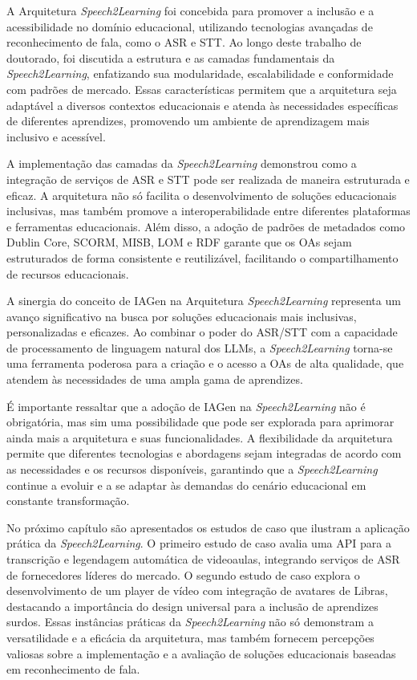 A Arquitetura \textit{Speech2Learning} foi concebida para promover a inclusão e a acessibilidade no domínio educacional, utilizando tecnologias avançadas de reconhecimento de fala, como o ASR e STT. Ao longo deste trabalho de doutorado, foi discutida a estrutura e as camadas fundamentais da \textit{Speech2Learning}, enfatizando sua modularidade, escalabilidade e conformidade com padrões de mercado. Essas características permitem que a arquitetura seja adaptável a diversos contextos educacionais e atenda às necessidades específicas de diferentes aprendizes, promovendo um ambiente de aprendizagem mais inclusivo e acessível.

A implementação das camadas da \textit{Speech2Learning} demonstrou como a integração de serviços de ASR e STT pode ser realizada de maneira estruturada e eficaz. A arquitetura não só facilita o desenvolvimento de soluções educacionais inclusivas, mas também promove a interoperabilidade entre diferentes plataformas e ferramentas educacionais. Além disso, a adoção de padrões de metadados como Dublin Core, SCORM, MISB, LOM e RDF garante que os OAs sejam estruturados de forma consistente e reutilizável, facilitando o compartilhamento de recursos educacionais.

A sinergia do conceito de IAGen na Arquitetura \textit{Speech2Learning} representa um avanço significativo na busca por soluções educacionais mais inclusivas, personalizadas e eficazes. Ao combinar o poder do ASR/STT com a capacidade de processamento de linguagem natural dos LLMs, a \textit{Speech2Learning} torna-se uma ferramenta poderosa para a criação e o acesso a OAs de alta qualidade, que atendem às necessidades de uma ampla gama de aprendizes.

É importante ressaltar que a adoção de IAGen na \textit{Speech2Learning} não é obrigatória, mas sim uma possibilidade que pode ser explorada para aprimorar ainda mais a arquitetura e suas funcionalidades. A flexibilidade da arquitetura permite que diferentes tecnologias e abordagens sejam integradas de acordo com as necessidades e os recursos disponíveis, garantindo que a \textit{Speech2Learning} continue a evoluir e a se adaptar às demandas do cenário educacional em constante transformação.

No próximo capítulo são apresentados os estudos de caso que ilustram a aplicação prática da \textit{Speech2Learning}. O primeiro estudo de caso avalia uma API para a transcrição e legendagem automática de videoaulas, integrando serviços de ASR de fornecedores líderes do mercado. O segundo estudo de caso explora o desenvolvimento de um player de vídeo com integração de avatares de Libras, destacando a importância do design universal para a inclusão de aprendizes surdos. Essas instâncias práticas da \textit{Speech2Learning} não só demonstram a versatilidade e a eficácia da arquitetura, mas também fornecem percepções valiosas sobre a implementação e a avaliação de soluções educacionais baseadas em reconhecimento de fala.